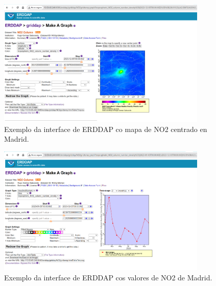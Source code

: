 \begin{figure}
    \centerline{\includegraphics[width=10cm]{figuras/NO2Madrid.png}}
    \caption{Exemplo da interface de ERDDAP co mapa de NO2 centrado en Madrid.}
    \label{fig:madridMapa}
\end{figure}
\begin{figure}
    \centerline{\includegraphics[width=10cm]{figuras/NO2MadridLineas.png}}
    \caption{Exemplo da interface de ERDDAP cos valores de NO2 de Madrid.}
    \label{fig:madridNO2}
\end{figure}
